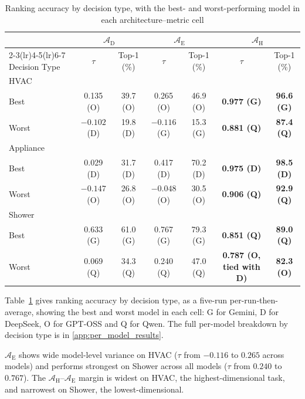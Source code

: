 \documentclass[final,3p,times]{elsarticle}
\begin{document}
\begin{table}[htpb]
\centering
\begin{threeparttable}
\centering
\footnotesize
\renewcommand{\arraystretch}{1.15}
\setlength{\tabcolsep}{4pt}
\begin{tabular}{lcccccc}
\toprule
 & \multicolumn{2}{c}{$\mathcal{A}_{\text{D}}$} & \multicolumn{2}{c}{$\mathcal{A}_{\text{E}}$} & \multicolumn{2}{c}{$\mathcal{A}_{\text{H}}$} \\
\cmidrule(lr){2-3}\cmidrule(lr){4-5}\cmidrule(lr){6-7}
Decision Type & $\tau$ & Top-1 (\%) & $\tau$ & Top-1 (\%) & $\tau$ & Top-1 (\%) \\
\midrule
HVAC & & & & & & \\
\quad Best & 0.135 (O) & 39.7 (O) & 0.265 (O) & 46.9 (O) & \textbf{0.977 (G)} & \textbf{96.6 (G)} \\
\quad Worst & $-0.102$ (D) & 19.8 (D) & $-0.116$ (G) & 15.3 (G) & \textbf{0.881 (Q)} & \textbf{87.4 (Q)} \\
Appliance & & & & & & \\
\quad Best & 0.029 (D) & 31.7 (D) & 0.417 (D) & 70.2 (D) & \textbf{0.975 (D)} & \textbf{98.5 (D)} \\
\quad Worst & $-0.147$ (O) & 26.8 (O) & $-0.048$ (O) & 30.5 (O) & \textbf{0.906 (Q)} & \textbf{92.9 (Q)} \\
Shower & & & & & & \\
\quad Best & 0.633 (G) & 61.0 (G) & 0.767 (G) & 79.3 (G) & \textbf{0.851 (Q)} & \textbf{89.0 (Q)} \\
\quad Worst & 0.069 (Q) & 34.3 (Q) & 0.240 (Q) & 47.0 (Q) & \textbf{0.787 (O, tied with D)} & \textbf{82.3 (O)} \\
\bottomrule
\end{tabular}
\setlength{\tabcolsep}{6pt}
\renewcommand{\arraystretch}{1.0}
\end{threeparttable}
\caption{Ranking accuracy by decision type, with the best- and worst-performing model in each architecture--metric cell}
\label{tab:item7}
\end{table}

Table~\ref{tab:item7} gives ranking accuracy by decision type, as a five-run per-run-then-average, showing the best and worst model in each cell: G for Gemini, D for DeepSeek, O for GPT-OSS and Q for Qwen. The full per-model breakdown by decision type is in \ref{app:per_model_results}.

$\mathcal{A}_{\text{E}}$ shows wide model-level variance on HVAC ($\tau$ from $-0.116$ to $0.265$ across models) and performs strongest on Shower across all models ($\tau$ from $0.240$ to $0.767$). The $\mathcal{A}_{\text{H}}$--$\mathcal{A}_{\text{E}}$ margin is widest on HVAC, the highest-dimensional task, and narrowest on Shower, the lowest-dimensional.
\end{document}

